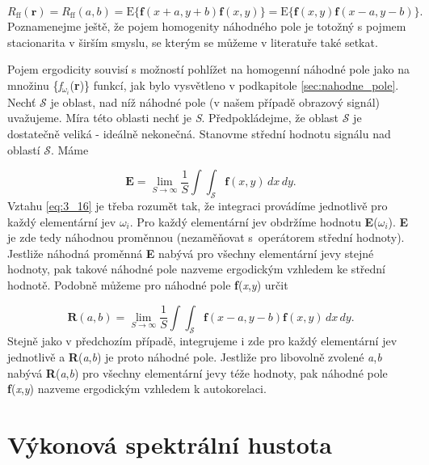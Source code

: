 \begin{equation} \label{eq:3_15}
    R_{\mathrm{ff}}(\mathbf{r}) = R_{\mathrm{ff}}(a, b) = \mathrm{E} \{ \mathbf{f}(x + a, y + b) \mathbf{f}(x, y) \} = \mathrm{E} \{\mathbf{f}(x, y) \mathbf{f}(x - a, y - b) \}.
\end{equation}
Poznamenejme ještě, že pojem homogenity náhodného pole je totožný s pojmem stacionarita v širším smyslu, se kterým se můžeme v literatuře také setkat.

Pojem ergodicity souvisí s možností pohlížet na homogenní náhodné pole jako na množinu \{\textit{f}$_{\omega_i}$(\textbf{r})\} funkcí, jak bylo vysvětleno v podkapitole \ref{sec:nahodne_pole}. Nechť $\mathscr{S}$ je oblast, nad níž náhodné pole (v našem případě obrazový signál) uvažujeme. Míra této oblasti nechť je \textit{S}. Předpokládejme, že oblast $\mathscr{S}$ je dostatečně veliká - ideálně nekonečná. Stanovme střední hodnotu signálu nad oblastí $\mathscr{S}$. Máme

\begin{equation} \label{eq:3_16}
    \mathbf{E} = \lim\limits_{S \rightarrow \infty} \frac{1}{S} \int\int_{\mathscr{S}} \mathbf{f}(x, y)\,dx\,dy.
\end{equation}
Vztahu \eqref{eq:3_16} je třeba rozumět tak, že integraci provádíme jednotlivě pro každý elementární jev $\omega_i$. Pro každý elementární jev obdržíme hodnotu \textbf{E}(${\omega_i}$). \textbf{E} je zde tedy náhodnou proměnnou (nezaměňovat s~operátorem střední hodnoty). Jestliže náhodná proměnná \textbf{E} nabývá pro všechny elementární jevy stejné hodnoty, pak takové náhodné pole nazveme ergodickým vzhledem ke střední hodnotě. Podobně můžeme pro náhodné pole \textbf{f}(\textit{x},\textit{y}) určit

\begin{equation} \label{eq:3_17}
    \mathbf{R}(a, b) = \lim\limits_{S \rightarrow \infty} \frac{1}{S} \int\int_{\mathscr{S}} \mathbf{f}(x - a, y - b) \mathbf{f}(x, y)\,dx\,dy.
\end{equation}
Stejně jako v předchozím případě, integrujeme i zde pro každý elementární jev jednotlivě a \textbf{R}(\textit{a},\textit{b}) je proto náhodné pole. Jestliže pro libovolně zvolené \textit{a},\textit{b} nabývá \textbf{R}(\textit{a},\textit{b}) pro všechny elementární jevy téže hodnoty, pak náhodné pole \textbf{f}(\textit{x},\textit{y}) nazveme ergodickým vzhledem k autokorelaci.

\section*{Výkonová spektrální hustota} \label{sec:vykonova_spektralni_hustota}

